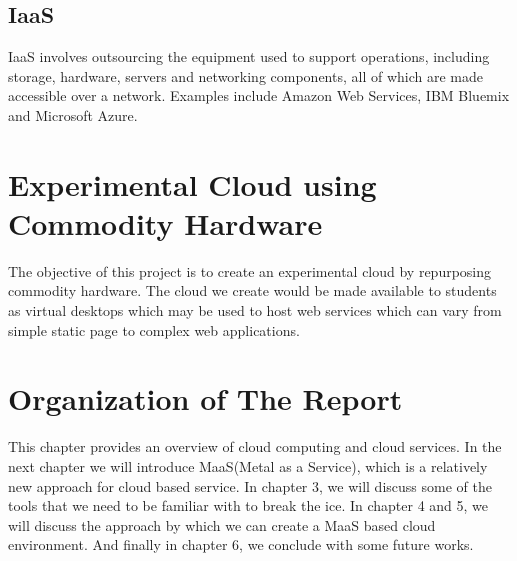 \subsection{IaaS}
IaaS involves outsourcing the equipment used to support operations, including storage, hardware, servers and networking components, all of which are made accessible over a network. Examples include Amazon Web Services, IBM Bluemix and Microsoft Azure.

\section{Experimental Cloud using Commodity Hardware}

The objective of this project is to create an experimental
cloud by repurposing commodity hardware. The cloud we create would
be made available to students as virtual desktops which may be used
to host web services which can vary from simple static page to
complex web applications. 

\section{Organization of The Report}

This chapter provides an overview of cloud computing and cloud services.
In the next chapter we will introduce MaaS(Metal as a Service), which is a relatively new approach for cloud based service. 
In chapter 3, we will discuss some of the tools that we need to be familiar with to break the ice. In chapter 4 and 5, we will discuss the approach by which we can create a MaaS based cloud environment. And finally in chapter 6, we conclude with some future works.
